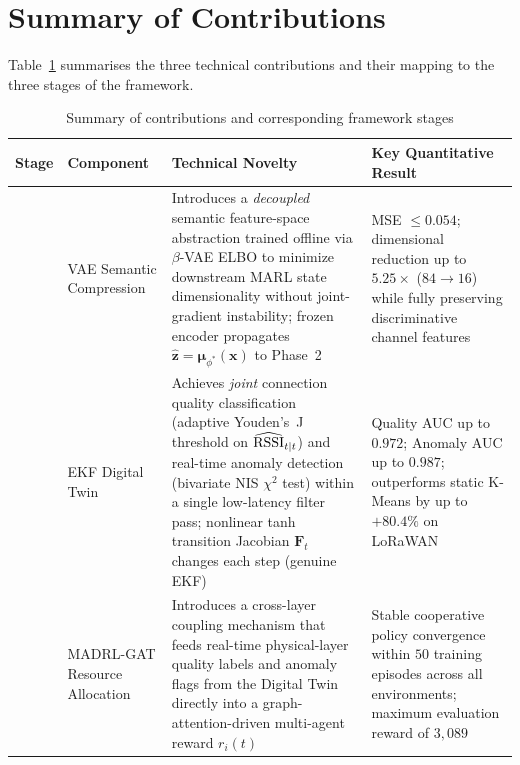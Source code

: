 \documentclass[12pt,a4paper]{article}
\begin{document}
\section{Summary of Contributions}
\label{sec:summary}

Table~\ref{tab:contrib} summarises the three technical contributions and
their mapping to the three stages of the framework.

\begin{table}[H]
\centering
\caption{Summary of contributions and corresponding framework stages}
\label{tab:contrib}
\setlength{\tabcolsep}{4pt}
\begin{tabular}{>{\raggedright\arraybackslash}p{}
                >{\raggedright\arraybackslash}p{}
                >{\raggedright\arraybackslash}p{}
                >{\raggedright\arraybackslash}p{}}
\toprule
\textbf{Stage} & \textbf{Component} & \textbf{Technical Novelty}
    & \textbf{Key Quantitative Result} \\
\midrule
1 & VAE Semantic Compression
  & Introduces a \textit{decoupled} semantic feature-space abstraction
    trained offline via $\beta$-VAE ELBO to minimize downstream MARL
    state dimensionality without joint-gradient instability; frozen
    encoder propagates $\hat{\mathbf{z}}=\bm{\mu}_{\phi^*}(\mathbf{x})$
    to Phase~2
  & MSE $\leq 0.054$; dimensional reduction up to $5.25\times$
    ($84\!\to\!16$) while fully preserving discriminative channel features \\
\midrule
2 & EKF Digital Twin
  & Achieves \textit{joint} connection quality classification
    (adaptive Youden's~J threshold on $\widehat{\rm RSSI}_{t|t}$)
    and real-time anomaly detection (bivariate NIS $\chi^2$ test)
    within a single low-latency filter pass; nonlinear tanh
    transition Jacobian $\mathbf{F}_t$ changes each step (genuine EKF)
  & Quality AUC up to $0.972$; Anomaly AUC up to $0.987$;
    outperforms static K-Means by up to $+80.4\%$ on LoRaWAN \\
\midrule
3 & MADRL-GAT Resource Allocation
  & Introduces a cross-layer coupling mechanism that feeds
    real-time physical-layer quality labels and anomaly flags
    from the Digital Twin directly into a graph-attention-driven
    multi-agent reward $r_i(t)$
  & Stable cooperative policy convergence within $50$ training
    episodes across all environments; maximum evaluation reward
    of $3{,}089$ \\
\bottomrule
\end{tabular}
\end{table}
\end{document}
